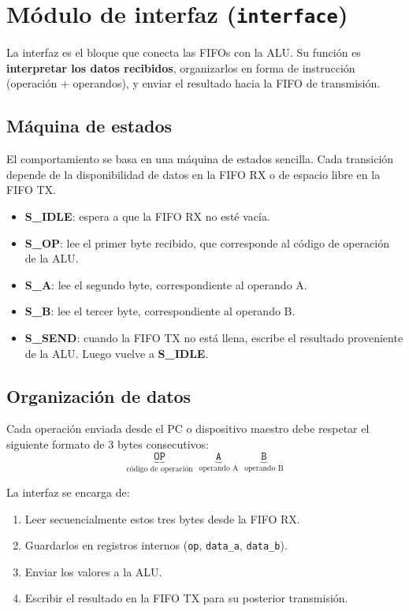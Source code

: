 \section{Módulo de interfaz (\texttt{interface})}

La interfaz es el bloque que conecta las FIFOs con la ALU. Su función es \textbf{interpretar los datos recibidos}, organizarlos en forma de instrucción (operación + operandos), y enviar el resultado hacia la FIFO de transmisión.

\subsection{Máquina de estados}
El comportamiento se basa en una máquina de estados sencilla. Cada transición depende de la disponibilidad de datos en la FIFO RX o de espacio libre en la FIFO TX.

\begin{itemize}
    \item \textbf{S\_IDLE}: espera a que la FIFO RX no esté vacía.
    \item \textbf{S\_OP}: lee el primer byte recibido, que corresponde al código de operación de la ALU.
    \item \textbf{S\_A}: lee el segundo byte, correspondiente al operando A.
    \item \textbf{S\_B}: lee el tercer byte, correspondiente al operando B.
    \item \textbf{S\_SEND}: cuando la FIFO TX no está llena, escribe el resultado proveniente de la ALU. Luego vuelve a \textbf{S\_IDLE}.
\end{itemize}

\subsection{Organización de datos}
Cada operación enviada desde el PC o dispositivo maestro debe respetar el siguiente formato de 3 bytes consecutivos:
\[
\underbrace{\texttt{OP}}_{\text{código de operación}} \;\;
\underbrace{\texttt{A}}_{\text{operando A}} \;\;
\underbrace{\texttt{B}}_{\text{operando B}}
\]

La interfaz se encarga de:
\begin{enumerate}
    \item Leer secuencialmente estos tres bytes desde la FIFO RX.
    \item Guardarlos en registros internos (\texttt{op}, \texttt{data\_a}, \texttt{data\_b}).
    \item Enviar los valores a la ALU.
    \item Escribir el resultado en la FIFO TX para su posterior transmisión.
\end{enumerate}


